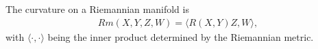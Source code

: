 \begin{definition}
The curvature on a Riemannian manifold is
\begin{align*}
Rm(X,Y,Z,W) = \langle R(X,Y)Z, W \rangle,
\end{align*}
with $\langle \cdot ,  \cdot \rangle $ being the inner product determined by the Riemannian metric.
\end{definition}



\newpage
\thispagestyle{empty}
\cleartooddpage

